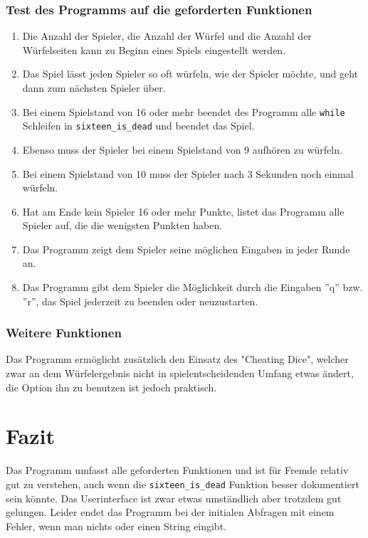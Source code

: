 \subsubsection*{Test des Programms auf die geforderten Funktionen}
\begin{enumerate}
\item Die Anzahl der Spieler, die Anzahl der Würfel und die Anzahl der Würfelseiten kann zu Beginn eines Spiels eingestellt werden.
\item Das Spiel lässt jeden Spieler so oft würfeln, wie der Spieler möchte, und geht dann zum nächsten Spieler über.
\item Bei einem Spielstand von 16 oder mehr beendet des Programm alle \verb+while+ Schleifen in \verb+sixteen_is_dead+ und beendet das Spiel.
\item Ebenso muss der Spieler bei einem Spielstand von 9 aufhören zu würfeln.
\item Bei einem Spielstand von 10 muss der Spieler nach 3 Sekunden noch einmal würfeln.
\item Hat am Ende kein Spieler 16 oder mehr Punkte, listet das Programm alle Spieler auf, die die wenigsten Punkten haben.
\item Das Programm zeigt dem Spieler seine möglichen Eingaben in jeder Runde an.
\item Das Programm gibt dem Spieler die Möglichkeit durch die Eingaben ''q'' bzw. ''r'', das Spiel jederzeit zu beenden oder neuzustarten.
\end{enumerate}

\subsubsection*{Weitere Funktionen}

Das Programm ermöglicht zusätzlich den Einsatz des "Cheating Dice", welcher zwar an dem Würfelergebnis nicht in spielentscheidenden Umfang etwas ändert, die Option ihn zu benutzen ist jedoch praktisch.

\section*{Fazit}
Das Programm umfasst alle geforderten Funktionen und ist für Fremde relativ gut zu verstehen, auch wenn die \verb+sixteen_is_dead+ Funktion besser dokumentiert sein könnte.
Das Userinterface ist zwar etwas umständlich aber trotzdem gut gelungen. Leider endet das Programm bei der initialen Abfragen mit einem Fehler, wenn man nichts oder einen String eingibt.

